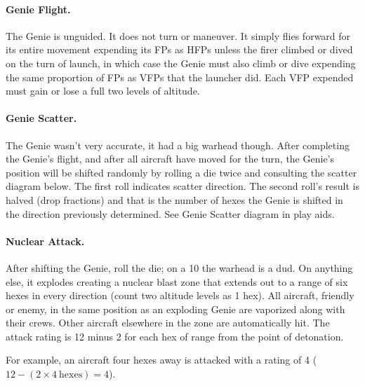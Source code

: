 \paragraph{Genie Flight.} The Genie is unguided. It does not turn or maneuver. It simply flies forward for its entire movement expending its FPs as HFPs unless the firer climbed or dived on the turn of launch, in which case the Genie must also climb or dive expending the same proportion of FPs as VFPs that the launcher did. Each VFP expended must gain or lose a full two levels of altitude.

\paragraph{Genie Scatter.} The Genie wasn't very accurate, it had a big warhead though. After completing the Genie's flight, and after all aircraft have moved for the turn, the Genie’s position will be shifted randomly by rolling a die twice and consulting the scatter diagram below. The first roll indicates scatter direction. The second roll's result is halved (drop fractions) and that is the number of hexes the Genie is shifted in the direction previously determined. See Genie Scatter diagram in play aids.

\paragraph{Nuclear Attack.} After shifting the Genie, roll the die; on a 10 the warhead is a dud. On anything else, it explodes creating a nuclear blast zone that extends out to a range of six hexes in every direction (count two altitude levels as 1 hex). All aircraft, friendly or enemy, in the same position as an exploding Genie are vaporized along with their crews. Other aircraft elsewhere in the zone are automatically hit. The attack rating is 12 minus 2 for each hex of range from the point of detonation.

For example, an aircraft four hexes away is attacked with a rating of 4 ($12 - (2 \times 4\ \mathrm{hexes}) = 4$).

